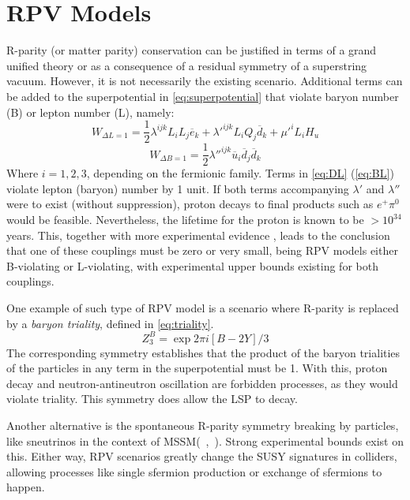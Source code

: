 \section{RPV Models}
\label{sec:RPV}
R-parity (or matter parity) conservation can be justified in terms of a grand unified theory or as a consequence of a residual symmetry of a superstring vacuum. However, it is not necessarily the existing scenario. Additional terms can be added to the superpotential in \ref{eq:superpotential} that violate baryon number (B) or lepton number (L), namely: 
\begin{equation}
W_{\Delta L=1} = \frac{1}{2}\lambda^{ijk}L_iL_j\overline{e}_k + \lambda'^{ijk}L_iQ_j\overline{d}_k + \mu'^i L_i H_u 
\label{eq:DL}
\end{equation}
\begin{equation}
W_{\Delta B=1} = \frac{1}{2}\lambda''^{ijk}\overline{u}_i\overline{d}_j\overline{d}_k
\label{eq:DB}
\end{equation}
Where $i=1,2,3$, depending on the fermionic family. Terms in \ref{eq:DL} (\ref{eq:BL}) violate lepton (baryon) number by 1 unit. If both terms accompanying $\lambda'$ and $\lambda''$ were to exist (without suppression), proton decays to final products such as $e^+\pi^0$ would be feasible. Nevertheless, the lifetime for the proton is known to be $> 10^{34}$ years. This, together with more experimental evidence , leads to the conclusion that one of these couplings must be zero or very small, being RPV models either B-violating or L-violating, with experimental upper bounds existing for both couplings. 

One example of such type of RPV model is a scenario where R-parity is replaced by a \textit{baryon triality}, defined in \ref{eq:triality}.
\begin{equation}
Z_3^B = \exp{2\pi i[B-2Y]/3}
\label{eq:triality}
\end{equation}
The corresponding symmetry establishes that the product of the baryon trialities of the particles in any term in the superpotential must be 1. With this, proton decay and neutron-antineutron oscillation are forbidden processes, as they would violate triality. This symmetry does allow the LSP to decay. 

Another alternative is the spontaneous R-parity symmetry breaking by particles, like sneutrinos in the context of MSSM(~\cite{MASIERO1990273},~\cite{ROMAO1992311}). Strong experimental bounds exist on this. Either way, RPV scenarios greatly change the SUSY signatures in colliders, allowing processes like single sfermion production or exchange of sfermions to happen. %

